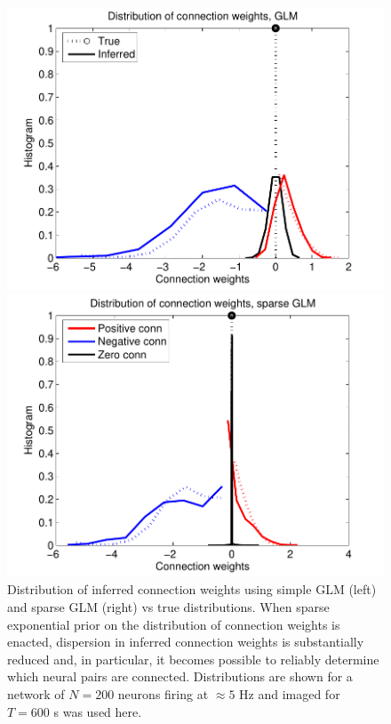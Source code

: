 \begin{figure}[h]
\centering
\begin{minipage}[c]{0.45\hsize}
\includegraphics[width=\hsize]{../figs/FigureA3_hist_glm200}
\end{minipage}
\begin{minipage}[c]{0.45\hsize}
\includegraphics[width=\hsize]{../figs/FigureA3_hist_spa200}
\end{minipage}
\caption{Distribution of inferred connection weights using simple GLM (left) and sparse GLM (right) vs true distributions. When sparse exponential prior on the distribution of connection weights is enacted, dispersion in inferred connection weights is substantially reduced and, in particular, it becomes possible to reliably determine which neural pairs are connected. Distributions are shown for a network of $N=200$ neurons firing at $\approx 5$ Hz and imaged for $T=600$ s was used here.}
\label{fig:distros}
\end{figure}

